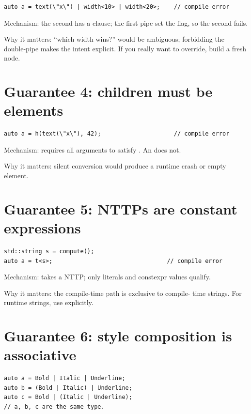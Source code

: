 \begin{lstlisting}
auto a = text(\"x\") | width<10> | width<20>;    // compile error
\end{lstlisting}

Mechanism: the second  has a  clause; the first pipe set the flag, so the
second fails.

Why it matters: ``which width wins?'' would be ambiguous;
forbidding the double-pipe makes the intent explicit. If you
really want to override, build a fresh node.

\section{Guarantee 4: children must be elements}

\begin{lstlisting}
auto a = h(text(\"x\"), 42);                     // compile error
\end{lstlisting}

Mechanism:  requires all arguments to satisfy
. An  does not.

Why it matters: silent conversion would produce a runtime crash
or empty element.

\section{Guarantee 5: NTTPs are constant expressions}

\begin{lstlisting}
std::string s = compute();
auto a = t<s>;                                 // compile error
\end{lstlisting}

Mechanism:  takes a  NTTP; only literals
and constexpr values qualify.

Why it matters: the compile-time path is exclusive to compile-
time strings. For runtime strings, use  explicitly.

\section{Guarantee 6: style composition is associative}

\begin{lstlisting}
auto a = Bold | Italic | Underline;
auto b = (Bold | Italic) | Underline;
auto c = Bold | (Italic | Underline);
// a, b, c are the same type.
\end{lstlisting}


